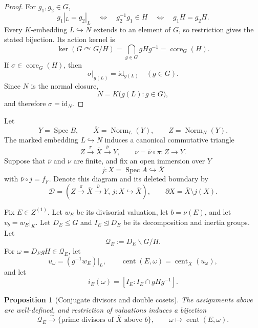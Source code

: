\documentclass[11pt]{article}
\newtheorem{proposition}[theorem]{Proposition}
\theoremstyle{remark}
\theoremstyle{definition}
\DeclareMathOperator{\Spec}{Spec}
\DeclareMathOperator{\Norm}{Norm}
\DeclareMathOperator{\core}{core}
\newcommand{\id}{\mathrm{id}}
\begin{document}
\begin{proof}
For \(g_1,g_2\in G\),
\[
  g_1|_L=g_2|_L
  \quad\Longleftrightarrow\quad
  g_2^{-1}g_1\in H
  \quad\Longleftrightarrow\quad
  g_1H=g_2H.
\]
Every \(K\)-embedding \(L\hookrightarrow N\) extends to an element of
\(G\), so restriction gives the stated bijection.  Its action kernel is
\[
  \ker\!\left(G\curvearrowright G/H\right)
  =
  \bigcap_{g\in G}gHg^{-1}
  =
  \core_G(H).
\]
If \(\sigma\in\core_G(H)\), then
\[
  \sigma|_{g(L)}=\id_{g(L)}
  \quad(g\in G).
\]
Since \(N\) is the normal closure,
\[
  N=K\bigl(g(L):g\in G\bigr),
\]
and therefore \(\sigma=\id_N\).
\end{proof}

Let
\[
  Y=\Spec B,
  \qquad
  \overline X=\Norm_L(Y),
  \qquad
  Z=\Norm_N(Y).
\]
The marked embedding \(L\hookrightarrow N\) induces a canonical
commutative triangle
\[
  Z\xrightarrow{\pi}\overline X\xrightarrow{\bar\nu}Y,
  \qquad
  \nu=\bar\nu\circ\pi\colon Z\longrightarrow Y.
\]
Suppose that \(\bar\nu\) and \(\nu\) are finite, and fix an open
immersion over \(Y\)
\[
  j\colon X=\Spec A\hookrightarrow\overline X
\]
with \(\bar\nu\circ j=f_F\).  Denote this diagram and its deleted boundary
by
\[
  \mathcal D=
  \left(
    Z\xrightarrow{\pi}\overline X\xrightarrow{\bar\nu}Y,\,
    j\colon X\hookrightarrow\overline X
  \right),
  \qquad
  \partial X=\overline X\setminus j(X).
\]

Fix \(E\in Z^{(1)}\).  Let \(w_E\) be its divisorial
valuation, let \(b=\nu(E)\), and let \(v_b=w_E|_K\).
Let \(D_E\leq G\) and \(I_E\trianglelefteq D_E\) be its decomposition and
inertia groups.  Let
\[
  \mathcal Q_E:=D_E\backslash G/H.
\]
For \(\omega=D_EgH\in\mathcal Q_E\), let
\[
  u_\omega=(g^{-1}w_E)|_L,
  \qquad
  \operatorname{cent}(E,\omega)
  =\operatorname{cent}_{\overline X}(u_\omega),
\]
and let
\[
  i_E(\omega)=[I_E:I_E\cap gHg^{-1}].
\]
\begin{proposition}[Conjugate divisors and double cosets]
\label{prop:conjugate-divisor-double-cosets}
The assignments above are well-defined, and restriction of valuations
induces a bijection
\[
  \mathcal Q_E
  \xrightarrow{\sim}
  \{\text{prime divisors of }\overline X\text{ above }b\},
  \qquad
  \omega\longmapsto\operatorname{cent}(E,\omega).
\]
\end{proposition}
\end{document}
